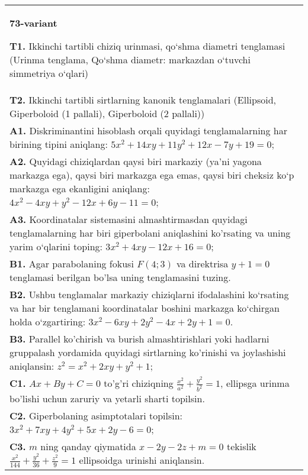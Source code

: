 \documentclass{article}
\begin{document}
\begin{tabular}{m{17cm}}
\textbf{73-variant}
\newline

\textbf{T1.} Ikkinchi tartibli chiziq urinmasi, qo‘shma diametri tenglamasi (Urinma tenglama, Qo‘shma diametr: markazdan o‘tuvchi simmetriya o‘qlari) \\
\textbf{T2.} Ikkinchi tartibli sirtlarning kanonik tenglamalari (Ellipsoid, Giperboloid (1 pallali), Giperboloid (2 pallali)) \\
\textbf{A1.} Diskriminantini hisoblash orqali quyidagi tenglamalarning har birining tipini aniqlang: $5 x^2+14 x y+11 y^2+12 x-7 y+19=0$; \\
\textbf{A2.} Quyidagi chiziqlardan qaysi biri markaziy (ya’ni yagona markazga ega), qaysi biri markazga ega emas, qaysi biri cheksiz ko‘p markazga ega ekanligini aniqlang: $4 x^2-4 x y+y^2-12 x+6 y-11=0$; \\
\textbf{A3.} Koordinatalar sistemasini almashtirmasdan quyidagi tenglamalarning har biri giperbolani aniqlashini ko'rsating va uning yarim o‘qlarini toping: $3 x^2+4 x y-12 x+16=0$; \\
\textbf{B1.} Agar parabolaning fokusi $F (4;3) $ va direktrisa $y+1=0$ tenglamasi berilgan bo'lsa uning tenglamasini tuzing. \\
\textbf{B2.} Ushbu tenglamalar markaziy chiziqlarni ifodalashini ko‘rsating va har bir tenglamani koordinatalar boshini markazga ko‘chirgan holda o‘zgartiring: $3x^2-6xy+2y^2-4x+2y+1=0$. \\
\textbf{B3.} Parallel ko'chirish va burish almashtirishlari yoki hadlarni gruppalash yordamida quyidagi sirtlarning ko'rinishi va joylashishi aniqlansin: $z^2=x^2+2 x y+y^2+1$; \\
\textbf{C1.} $A x+B y+C=0$ to'g'ri chiziqning $\frac{x^2}{a^2}+\frac{y^2}{b^2}=1$, ellipsga urinma bo'lishi uchun zaruriy va yetarli sharti topilsin. \\
\textbf{C2.} Giperbolaning asimptotalari topilsin: $3 x^2+7 x y+4 y^2+5 x+2 y-6=0$; \\
\textbf{C3.} $m$ ning qanday qiymatida $x-2 y-2 z+m=0$ tekislik $\frac{x^2}{144}+\frac{y^2}{36}+\frac{z^2}{9}=1$ ellipsoidga urinishi aniqlansin. \\

\end{tabular}
\vspace{1cm}
\end{document}
